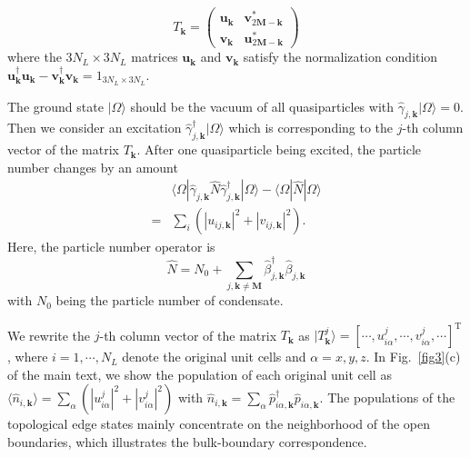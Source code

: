 \documentclass[aps,pra,floatfix,twocolumn,superscriptaddress]{revtex4-1}
\begin{document}
\begin{equation}
	T_\mathbf{k}=\left(\begin{array}{cc}
		\mathbf{u}_{\mathbf{k}} & \mathbf{v}_{2\mathbf{M}-\mathbf{k}}^{*}\\
		\mathbf{v}_\mathbf{k} & \mathbf{u}_{2\mathbf{M}-\mathbf{k}}^{*}
	\end{array}\right)
\end{equation}
where the $3N_L\times 3N_L$ matrices $\mathbf{u}_{\mathbf{k}}$ and $\mathbf{v}_{\mathbf{k}}$ satisfy the normalization condition $\mathbf{u}_{\mathbf{k}}^\dagger \mathbf{u}_{\mathbf{k}}-\mathbf{v}_{\mathbf{k}}^\dagger \mathbf{v}_{\mathbf{k}}=1_{3N_L\times 3N_L}$.

The ground state $|\Omega\rangle$ should be the vacuum of all quasiparticles with $\hat{\gamma}_{j,\mathbf{k}}|\Omega\rangle=0$. Then we consider an excitation $\hat{\gamma}_{j,\mathbf{k}}^{\dagger}|\Omega\rangle$ which is corresponding to the $j$-th column vector of the matrix $T_{\mathbf{k}}$. After one quasiparticle being excited, the particle number changes by an amount
\begin{equation}
	\begin{aligned}
		&\langle\Omega|\hat{\gamma}_{j,\mathbf{k}}\hat{N}\hat{\gamma}_{j,\mathbf{k}}^{\dagger}|\Omega\rangle
		-\langle \Omega|\hat{N}|\Omega\rangle\\
		=&\sum_i(|u_{ij,\mathbf{k}}|^2+|v_{ij,\mathbf{k}}|^2).
	\end{aligned}
\end{equation}
Here, the particle number operator is
\begin{equation}
	\hat{N}=N_0+\sum_{j,{\mathbf{k}}\neq\mathbf{M}}\hat{\beta}_{j,{\mathbf{k}}}^{\dagger}\hat{\beta}_{j,\mathbf{k}}
\end{equation}
with $N_0$ being the particle number of condensate.

We rewrite the $j$-th column vector of the matrix $T_{\mathbf{k}}$ as $|T_{\mathbf{k}}^j\rangle=[\cdots,u_{i\alpha}^j,\cdots,v_{i\alpha}^j,\cdots]^\mathrm{T}$, where $i=1,\cdots,N_L$ denote the original unit cells and $\alpha=x,y,z$. In Fig.~\ref{fig3}(c) of the main text, we show the population of each original unit cell as $\langle \hat{n}_{i,\mathbf{k}}\rangle=\sum_\alpha (|u_{i\alpha}^j|^2+|v_{i\alpha}^j|^2)$ with $\hat{n}_{i,\mathbf{k}}=\sum_\alpha\hat{p}_{i\alpha,\mathbf{k}}^\dagger\hat{p}_{i\alpha,\mathbf{k}}$. The populations of the topological edge states mainly concentrate on the neighborhood of the open boundaries, which illustrates the bulk-boundary correspondence.
\end{document}
